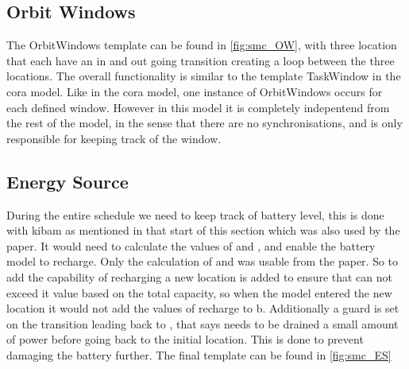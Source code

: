 \subsection{Orbit Windows}
The OrbitWindows template can be found in \cref{fig:smc_OW}, with three location that each have an in and out going transition creating a loop between the three locations. The overall functionality is similar to the template TaskWindow in the \gls{cora} model. Like in the \gls{cora} model, one instance of OrbitWindows occurs for each defined window. However in this model it is completely indepentend from the rest of the model, in the sense that there are no synchronisations, and is only responsible for keeping track of the window.


\subsection{Energy Source} \label{subsec:energy_src}
During the entire schedule we need to keep track of battery level, this is done with \gls{kibam} as mentioned in that start of this section which was also used by the paper. It would need to calculate the values of  and , and enable the battery model to recharge. Only the calculation of  and  was usable from the paper. So to add the capability of recharging a new location is added to ensure that  can not exceed it value based on the total capacity, so when the model entered the new location it would not add the values of recharge to b. Additionally a guard is set on the transition leading back to , that says  needs to be drained a small amount of power before going back to the initial location. This is done to prevent damaging the battery further. The final template can be found in \cref{fig:smc_ES}

